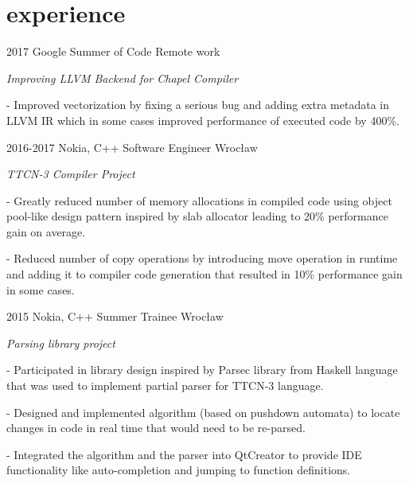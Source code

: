 \documentclass[]{twentysecondcv}
\begin{document}

\section{experience}

\begin{twenty}
  \twentyitem
    {2017}
    {Google Summer of Code}
    {Remote work}
    {
    \emph{Improving LLVM Backend for Chapel Compiler}
    
    - Improved vectorization by fixing a serious bug and adding extra metadata in LLVM IR which in some cases improved performance of executed code by 400\%. 
    
    }
  \twentyitem
    {2016-2017}
    {Nokia, C++ Software Engineer}
    {Wrocław}
    {
    \emph{TTCN-3 Compiler Project}
    
     - Greatly reduced number of memory allocations in compiled code using object pool-like design pattern inspired by slab allocator leading to 20\% performance gain on average.
     
     - Reduced number of copy operations by introducing move operation in runtime and adding it to compiler code generation that resulted in 10\% performance gain in some cases. }
     
\twentyitem
    {2015}
    {Nokia, C++ Summer Trainee}
    {Wrocław}
    {
    \emph{Parsing library project}
    
    - Participated in library design inspired by Parsec library from Haskell language that was used to implement partial parser for TTCN-3 language.
    
    - Designed and implemented algorithm (based on pushdown automata) to locate changes in code in real time that would need to be re-parsed.
    
    - Integrated the algorithm and the parser into QtCreator to provide IDE functionality like auto-completion and jumping to function definitions.
    
    }

\end{twenty}
\end{document}
